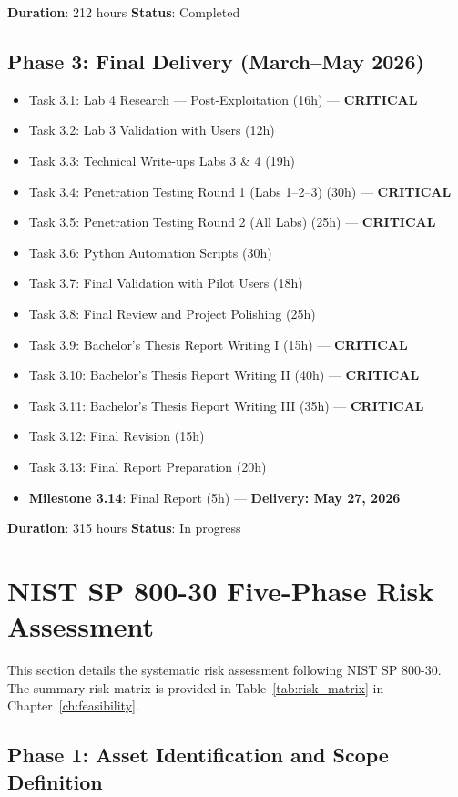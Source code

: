\textbf{Duration}: 212 hours \quad \textbf{Status}: Completed

\subsection{Phase 3: Final Delivery (March--May 2026)}

\begin{itemize}
\item Task 3.1: Lab 4 Research --- Post-Exploitation (16h) --- \textbf{CRITICAL}
\item Task 3.2: Lab 3 Validation with Users (12h)
\item Task 3.3: Technical Write-ups Labs 3 \& 4 (19h)
\item Task 3.4: Penetration Testing Round 1 (Labs 1--2--3) (30h) --- \textbf{CRITICAL}
\item Task 3.5: Penetration Testing Round 2 (All Labs) (25h) --- \textbf{CRITICAL}
\item Task 3.6: Python Automation Scripts (30h)
\item Task 3.7: Final Validation with Pilot Users (18h)
\item Task 3.8: Final Review and Project Polishing (25h)
\item Task 3.9: Bachelor's Thesis Report Writing I (15h) --- \textbf{CRITICAL}
\item Task 3.10: Bachelor's Thesis Report Writing II (40h) --- \textbf{CRITICAL}
\item Task 3.11: Bachelor's Thesis Report Writing III (35h) --- \textbf{CRITICAL}
\item Task 3.12: Final Revision (15h)
\item Task 3.13: Final Report Preparation (20h)
\item \textbf{Milestone 3.14}: Final Report (5h) --- \textbf{Delivery: May 27, 2026}
\end{itemize}

\textbf{Duration}: 315 hours \quad \textbf{Status}: In progress

\section{NIST SP 800-30 Five-Phase Risk Assessment}

This section details the systematic risk assessment following NIST SP 800-30\cite{nist_sp80030}.
The summary risk matrix is provided in Table~\ref{tab:risk_matrix} in Chapter~\ref{ch:feasibility}.

\subsection{Phase 1: Asset Identification and Scope Definition}

